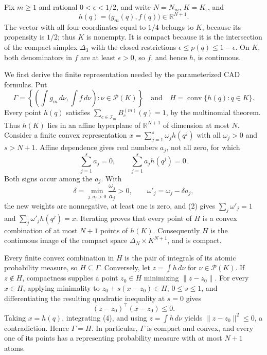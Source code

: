 Fix \(m\geq 1\) and rational \(0<\epsilon<1/2\), and write \(N=N_m\), \(K=K_{\epsilon}\), and
\[
h(q)=\bigl(g_m(q),f(q)\bigr)\in\mathbb R^{N+1}.
\]
The vector with all four coordinates equal to \(1/4\) belongs to \(K\), because its propensity is \(1/2\); thus \(K\) is nonempty.  It is compact because it is the intersection of the compact simplex \(\Delta_3\) with the closed restrictions \(\epsilon\leq p(q)\leq1-\epsilon\).  On \(K\), both denominators in \(f\) are at least \(\epsilon>0\), so \(f\), and hence \(h\), is continuous.

We first derive the finite representation needed by the parameterized CAD formulas.  Put
\[
\Gamma=\left\{\left(\int g_m\,d\nu,\int f\,d\nu\right):\nu\in\mathcal P(K)\right\}
\quad\text{and}\quad
H=\operatorname{conv}\{h(q):q\in K\}.
\tag{1}
\]
Every point \(h(q)\) satisfies \(\sum_{c\in\mathcal I_m}B_c^{(m)}(q)=1\), by the multinomial theorem.  Thus \(h(K)\) lies in an affine hyperplane of \(\mathbb R^{N+1}\) of dimension at most \(N\).  Consider a finite convex representation \(x=\sum_{j=1}^s\omega_jh(q^j)\) with all \(\omega_j>0\) and \(s>N+1\).  Affine dependence gives real numbers \(a_j\), not all zero, for which
\[
\sum_{j=1}^s a_j=0,
\qquad
\sum_{j=1}^s a_jh(q^j)=0.
\tag{2}
\]
Both signs occur among the \(a_j\).  With
\[
\delta=\min_{j:a_j>0}\frac{\omega_j}{a_j}>0,
\qquad
\omega'_j=\omega_j-\delta a_j,
\tag{3}
\]
the new weights are nonnegative, at least one is zero, and (2) gives \(\sum_j\omega'_j=1\) and \(\sum_j\omega'_jh(q^j)=x\).  Iterating proves that every point of \(H\) is a convex combination of at most \(N+1\) points of \(h(K)\).  Consequently \(H\) is the continuous image of the compact space \(\Delta_N\times K^{N+1}\), and is compact.

Every finite convex combination in \(H\) is the pair of integrals of its atomic probability measure, so \(H\subseteq\Gamma\).  Conversely, let \(z=\int h\,d\nu\) for \(\nu\in\mathcal P(K)\).  If \(z\notin H\), compactness supplies a point \(z_0\in H\) minimizing \(\lVert z-z_0\rVert\).  For every \(x\in H\), applying minimality to \(z_0+s(x-z_0)\in H\), \(0\leq s\leq1\), and differentiating the resulting quadratic inequality at \(s=0\) gives
\[
(z-z_0)^{\top}(x-z_0)\leq0.
\tag{4}
\]
Taking \(x=h(q)\), integrating (4), and using \(z=\int h\,d\nu\) yields \(\lVert z-z_0\rVert^2\leq0\), a contradiction.  Hence \(\Gamma=H\).  In particular, \(\Gamma\) is compact and convex, and every one of its points has a representing probability measure with at most \(N+1\) atoms.


